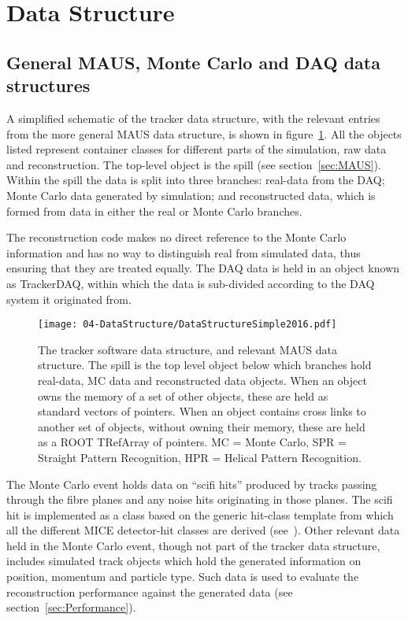 \section{Data Structure}
\label{sec:DataStructure}

\subsection{General MAUS, Monte Carlo and DAQ data structures}
\label{subsec:GeneralDataStructure}
A simplified schematic of the tracker data structure, with the relevant entries from the more general MAUS data structure, is shown in figure~\ref{figureDataStructure}.  All the objects listed represent container classes for different parts of the simulation, raw data and reconstruction.  The top-level object is the spill (see section~\ref{sec:MAUS}).  Within the spill the data is split into three branches: real-data from the DAQ; Monte Carlo data generated by simulation; and reconstructed data, which is formed from data in either the real or Monte Carlo branches. 

The reconstruction code makes no direct reference to the Monte Carlo information and has no way to distinguish real from simulated data, thus ensuring that they are treated equally.  The DAQ data is held in an object known as TrackerDAQ, within which the data is sub-divided according to the DAQ system it originated from.%

\begin{figure}[bt]
  \begin{center}
    \texttt{[image: 04-DataStructure/DataStructureSimple2016.pdf]}
    \caption{\label{figureDataStructure}The tracker software data structure, and relevant MAUS data structure.  The spill is the top level object below which branches hold real-data, MC data and reconstructed data objects. When an object owns the memory of a set of other objects, these are held as standard vectors of pointers. When an object contains cross links to another set of objects, without owning their memory, these are held as a ROOT TRefArray of pointers. MC = Monte Carlo, SPR = Straight Pattern Recognition, HPR = Helical Pattern Recognition.}
  \end{center}
\end{figure}

The Monte Carlo event holds data on ``scifi hits'' produced by tracks passing through the fibre planes and any noise hits originating in those planes. The scifi hit is implemented as a class based on the generic hit-class template from which all the different MICE detector-hit classes are derived (see~\cite{MausPaper}).  Other relevant data held in the Monte Carlo event, though not part of the tracker data structure, includes simulated track objects which hold the generated information on position, momentum and particle type.  Such data is used to evaluate the reconstruction performance against the generated data (see section~\ref{sec:Performance}).

